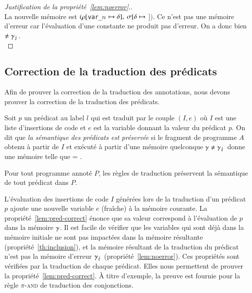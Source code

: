 \begin{proof}[Justification de la propriété~\ref{lem:noerror}.]~\\
  La nouvelle mémoire est
  $(\rho[$\lstinline'var_'$n$ $\mapsto \delta],$
  $\sigma[\delta \mapsto$ $])$.
  Ce n'est pas une mémoire d'erreur car l'évaluation d'une constante ne produit
  pas d'erreur.
  On a donc bien
   $\neq \gamma_\lightning$.
  ~\\
\end{proof}


\subsection{Correction de la traduction des prédicats}
\label{sec:predicate-translation}


Afin de prouver la correction de la traduction des annotations,
nous devons prouver la correction de la traduction des prédicats.

\begin{definition}
  \label{def:pred-correct}
  Soit $p$ un prédicat au label $l$ qui est traduit par le couple $(I, e)$ où
  $I$ est une liste d'insertions de code et $e$ est la variable donnant la
  valeur du prédicat $p$.
  On dit que \emph{la sémantique des prédicats est préservée} si le fragment de
  programme $A$ obtenu à partir de $I$ et exécuté à partir d'une mémoire
  quelconque $\gamma \neq \gamma_\lightning$ donne une mémoire  telle
  que  = .
\end{definition}

\begin{myproperty}
  \label{lem:pred-correct}
  Pour tout programme annoté $P$, les règles de traduction préservent la
  sémantique de tout prédicat \eacsl dans $P$.
\end{myproperty}

L'évaluation des insertions de code $I$ générées lors de la traduction d'un
prédicat $p$ ajoute une nouvelle variable $e$ (fraîche) à la mémoire courante.
La propriété~\ref{lem:pred-correct} énonce que sa valeur correspond à
l'évaluation de $p$ dans la mémoire $\gamma$.
Il est facile de vérifier que les variables qui sont déjà dans la mémoire
initiale ne sont pas impactées dans la mémoire résultante
(propriété~\ref{th:inclusion}), et la mémoire résultant de la traduction du
prédicat n'est pas la mémoire d'erreur $\gamma_\lightning$
(propriété~\ref{lem:noerror}).
Ces propriétés sont vérifiées par la traduction de chaque prédicat.
Elles nous permettent de prouver la propriété~\ref{lem:pred-correct}.
À titre d'exemple, la preuve est fournie pour la règle \textsc{$\pi$-and} de
traduction des conjonctions.



